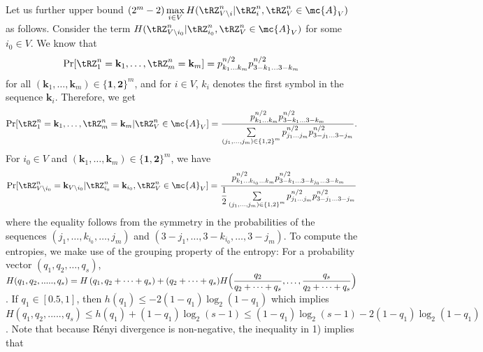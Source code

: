  
Let us further upper bound $(2^{m}-2)\max \limits_{i \in V} H(\tRZ^n_{V \backslash i}|\tRZ^n_{i},\tRZ^n_V\in \mc{A}_{V})$ as follows. Consider the term $H(\tRZ^n_{V \backslash i_0}|\tRZ^n_{i_0},\tRZ^n_V\in \mc{A}_{V})$ for some $i_0 \in V$. We know that 
 \begin{align*}
  \Pr[\tRZ^n_1= \mathbf{k}_1,\ldots,\tRZ^n_m=\mathbf{k}_m]= p_{k_1\ldots k_m}^{n/2}p_{3-k_1\ldots 3-k_m}^{n/2}
 \end{align*}
for all $(\mathbf{k}_1, \ldots, \mathbf{k}_m) \in \{\mathbf{1},\mathbf{2}\}^m$, and for $i \in V$, $k_i$ denotes the first symbol in the sequence $\mathbf{k}_i$. Therefore, we get
\begin{align*}
  \Pr[\tRZ^n_1=\mathbf{k}_1,\ldots,\tRZ^n_m=\mathbf{k}_m|\tRZ^n_V\in \mc{A}_{V}]%
  = \dfrac{p_{k_1\ldots k_m}^{n/2}p_{3-k_1\ldots 3-k_m}^{n/2}}{\sum \limits_{\substack{(j_1,\ldots,j_m)\in \{1,2\}^m}}p_{j_1\ldots j_m}^{n/2}p_{3-j_1\ldots 3-j_m}^{n/2}}.
 \end{align*}
For $i_0 \in V$ and $(\mathbf{k}_1, \ldots, \mathbf{k}_m) \in \{\mathbf{1},\mathbf{2}\}^m$, we have 
 \begin{align*}
  \Pr[\tRZ^n_{V \backslash i_0}=\mathbf{k}_{V \backslash i_0} |\tRZ^n_{i_0}=\mathbf{k}_{i_0}, \tRZ^n_V\in \mc{A}_{V}]
  = \dfrac{p_{k_1\ldots k_{i_0}\ldots k_m}^{n/2}p_{3-k_1\ldots 3-k_{j_0}\ldots 3-k_m}^{n/2}}{\dfrac{1}{2}\sum \limits_{\substack{(j_1,\ldots,j_m)\in \{1,2\}^m}}p_{j_1\ldots j_m}^{n/2}p_{3-j_1\ldots 3-j_m}^{n/2}}
 \end{align*}
 where the equality follows from the symmetry in the probabilities of the sequences $(j_1,\ldots,k_{i_0},\ldots,j_m)$ and $(3-j_1,\ldots,3-k_{i_0},\ldots,3-j_m)$. To compute the entropies, we make use of the grouping property of the entropy: For a probability vector $(q_1, q_2, \ldots, q_s)$, $H(q_1, q_2,.....,q_s)= H\left(q_1, q_2+ \cdots+q_s\right)+ (q_2+ \cdots+q_s)H \Big(\dfrac{q_2}{q_2+ \cdots+q_s},\ldots,\linebreak \dfrac{q_s}{q_2+ \cdots+q_s}\Big)$. If $q_1 \in [0.5, 1]$, then $h(q_1)\leq - 2(1-q_1)\log_2 (1-q_1)$ which implies $H(q_1, q_2,.....,q_s)\leq h(q_1)+(1-q_1)\log_2 (s-1) \leq (1-q_1)\log_2 (s-1) - 2(1-q_1)\log_2 (1-q_1)$. Note that because R\'enyi divergence is non-negative, the inequality in 1) implies that
